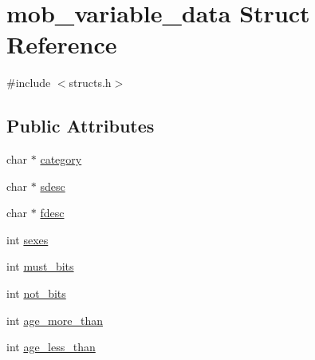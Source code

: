 \hypertarget{structmob__variable__data}{\section{mob\-\_\-variable\-\_\-data Struct Reference}
\label{structmob__variable__data}
}


{\ttfamily \#include $<$structs.\-h$>$}

\subsection*{Public Attributes}
\begin{DoxyCompactItemize}
\item 
char $\ast$ \hyperlink{structmob__variable__data_a3edcc3f6f3808c9ab9494af951068537}{category}
\item 
char $\ast$ \hyperlink{structmob__variable__data_af28c60cdb72077656863dcf5dc66e6f1}{sdesc}
\item 
char $\ast$ \hyperlink{structmob__variable__data_a08e2b2ce07fcbbd4bb86c9fb2f359298}{fdesc}
\item 
int \hyperlink{structmob__variable__data_a5a29910a8dcff5aaa22ad293a0206b21}{sexes}
\item 
int \hyperlink{structmob__variable__data_a67ba1cd09055d14386032befcfded821}{must\-\_\-bits}
\item 
int \hyperlink{structmob__variable__data_a7f6452ec387fdd6bc38850899d1355a1}{not\-\_\-bits}
\item 
int \hyperlink{structmob__variable__data_ad34ae70026755d59697750306249285d}{age\-\_\-more\-\_\-than}
\item 
int \hyperlink{structmob__variable__data_a607ec2011570ec31b0c8ad26ab7b645d}{age\-\_\-less\-\_\-than}
\end{DoxyCompactItemize}



